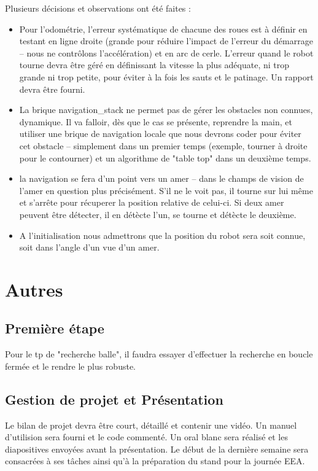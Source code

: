 \documentclass[a4wide,10pt]{article}
\begin{document}
Plusieurs décisions et observations ont été faites :

\begin{itemize}
\item Pour l'odométrie, l'erreur systématique de chacune des roues est à définir en testant en ligne droite (grande pour réduire l'impact de l'erreur du démarrage -- nous ne contrôlons l'accélération) et en arc de cerle. L'erreur quand le robot tourne devra être géré en définissant la vitesse la plus adéquate, ni trop grande ni trop petite, pour éviter à la fois les sauts et le patinage. Un rapport devra être fourni.
\item La brique navigation\_stack ne permet pas de gérer les obstacles non connues, dynamique. Il va falloir, dès que le cas se présente, reprendre la main, et utiliser une brique de navigation locale que nous devrons coder pour éviter cet obstacle -- simplement dans un premier temps (exemple, tourner à droite pour le contourner) et un algorithme de "table top" dans un deuxième temps.
\item la navigation se fera d'un point vers un amer -- dans le champs de vision de l'amer en question plus précisément. S'il ne le voit pas, il tourne sur lui même et s'arrête pour récuperer la position relative de celui-ci. Si deux amer peuvent être détecter, il en détècte l'un, se tourne et détècte le deuxième.
\item A l'initialisation nous admettrons que la position du robot sera soit connue, soit dans l'angle d'un vue d'un amer. 
\end{itemize}


\section*{Autres}

\subsection*{Première étape}
Pour le tp de "recherche balle", il faudra essayer d'effectuer la recherche en boucle fermée et le rendre le plus robuste.

\subsection*{Gestion de projet et Présentation}
Le bilan de projet devra être court, détaillé et contenir une vidéo. Un manuel d'utilision sera fourni et le code commenté. Un oral blanc sera réalisé et les diapositives envoyées avant la présentation. Le début de la dernière semaine sera consacrées à ses tâches ainsi qu'à la préparation du stand pour la journée EEA. 

\subsection*{\color{red}{Prochaine réunion : Mardi 21 mars 2017 entre 10h et 12h}}
\subsection*{\color{red}{Oral : Mecredi 22 mars 2017 après-midi}}
\subsection*{\color{red}{Stand : Jeudi 23 mars 2017 après-midi}}
\end{document}
